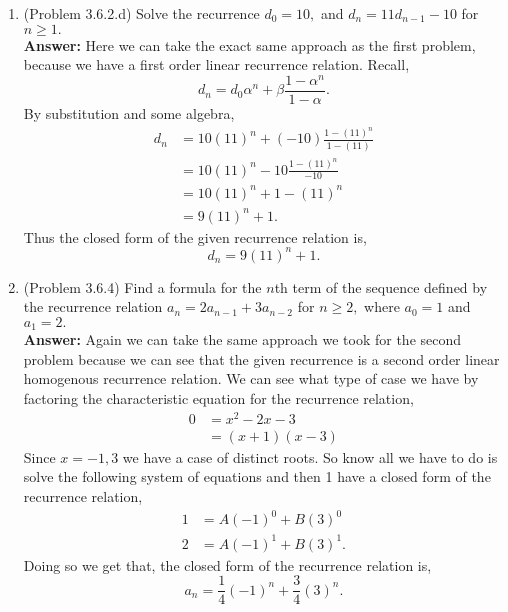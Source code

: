 \documentclass{amsart}
\begin{document}
\begin{enumerate}
\item (Problem 3.6.2.d) Solve the recurrence $d_0=10,$  and $d_n=11d_{n-1}-10$ for $n\geq 1.$\\

\textbf{Answer:} Here we can take the exact same approach as the first problem, because we have a first order linear recurrence relation. Recall,
\begin{equation*}
d_n = d_0\alpha^n+\beta\frac{1-\alpha^n}{1-\alpha}.
\end{equation*}
By substitution and some algebra,
\begin{align*}
d_n &= 10(11)^n+(-10)\frac{1-(11)^n}{1-(11)}\\
&= 10(11)^n-10\frac{1-(11)^n}{-10}\\
&= 10(11)^n+1-(11)^n\\
&= 9(11)^n+1.
\end{align*}
Thus the closed form of the given recurrence relation is,
\begin{equation*}
d_n= 9(11)^n+1.
\end{equation*}



\vspace{1in}

\item (Problem 3.6.4) Find a formula for the $n$th term  of the sequence defined by the recurrence relation $a_n=2a_{n-1}+3a_{n-2}$ for $n \geq 2,$ where $a_0=1$ and $a_1=2.$\\
\textbf{Answer:} Again we can take the same approach we took for the second problem because we can see that the given recurrence is a second order linear homogenous recurrence relation. We can see what type of case we have by factoring the characteristic equation for the recurrence relation,
\begin{align*}
0&=x^2-2x-3\\
& =(x+1)(x-3) 
\end{align*}
Since $x = -1, 3$ we have a case of distinct roots. So know all we have to do is solve the following system of equations and then 1 have a closed form of the recurrence relation,
\begin{align*}
1 &= A(-1)^{0}+B(3)^{0}\\
2 &= A(-1)^{1}+B(3)^{1}.
\end{align*}
Doing so we get that, the closed form of the recurrence relation is, 
\begin{equation*}
a_n = \frac{1}{4}(-1)^{n}+\frac{3}{4}(3)^{n}.
\end{equation*}



\end{enumerate}
\end{document}
